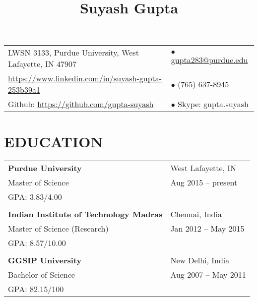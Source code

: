 \documentclass[10pt]{article}
\title{\vspace*{-2cm} \raggedright {\bf Suyash Gupta}}
\date{\vspace{-10ex}}	%
\begin{document}



\maketitle
{\hspace{-0.9cm}
\begin{tabular}{ll}
LWSN 3133, Purdue University, West Lafayette, IN 47907 	& $\bullet$ \href{mailto:gupta283@purdue.edu}{gupta283@purdue.edu} \\ 
\url{https://www.linkedin.com/in/suyash-gupta-253b39a1} & $\bullet$ (765) 637-8945 \\
Github: \url{https://github.com/gupta-suyash}  		& $\bullet$ Skype: gupta.suyash \\
\end{tabular}\newline
}

\section*{EDUCATION}
{\setlength{\tabcolsep}{40pt}
\hspace{-1.5cm}
\begin{tabular}{ll}
{\bf Purdue University} 			& West Lafayette, IN 	\\
Master of Science\footnotemark			& Aug 2015 -- present 	\\
GPA: 3.83/4.00					&			\\
						&			\\
{\bf Indian Institute of Technology Madras}	& Chennai, India	\\
Master of Science (Research)			& Jan 2012 -- May 2015 	\\
GPA: 8.57/10.00					&			\\
						&			\\
{\bf GGSIP University}				& New Delhi, India	\\ 
Bachelor of Science				& Aug 2007 -- May 2011	\\
GPA: 82.15/100					&			\\
\end{tabular}}
\end{document}
